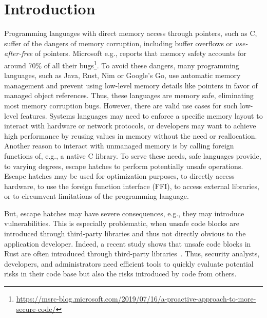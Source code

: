 \section{Introduction}
\label{sec:intro}

Programming languages with direct memory access through pointers, such as C, suffer of the dangers of memory corruption, including buffer overflows \cite{alnaeli2017, larochelle2001} or \textit{use-after-free} of pointers.
Microsoft e.g., reports that memory safety accounts for around 70\% of all their bugs\footnote{\url{https://msrc-blog.microsoft.com/2019/07/16/a-proactive-approach-to-more-secure-code/}}. 
To avoid these dangers, many programming languages, such as Java, Rust, Nim or Google's Go, use automatic memory management and  prevent using low-level memory details like pointers in favor of managed object references.
Thus, these languages are memory safe, eliminating most memory corruption bugs. 
However, there are valid use cases for such low-level features.
Systems languages may need to enforce a specific memory layout to interact with hardware or network protocols, or developers may want to achieve high performance by reusing values in memory without the need or reallocation. 
Another reason to interact with unmanaged memory is by calling foreign functions of, e.g., a native C library.
%
%
%
To serve these needs, safe languages provide, to varying degrees, escape hatches to perform potentially unsafe operations.
Escape hatches may be used for optimization purposes, to directly access hardware, to use the foreign function interface (FFI), to access external libraries, or to circumvent limitations of the programming language. 

But, escape hatches may have severe consequences, e.g., they may introduce vulnerabilities.
This is especially problematic, when unsafe code blocks are introduced through third-party libraries and thus not directly obvious to the application developer. 
Indeed, a recent study shows that unsafe code blocks in Rust are often introduced through third-party libraries~\cite{evans2020}. 
Thus, security analysts, developers, and administrators need efficient tools to quickly evaluate potential risks in their code base but also the risks introduced by code from others.

